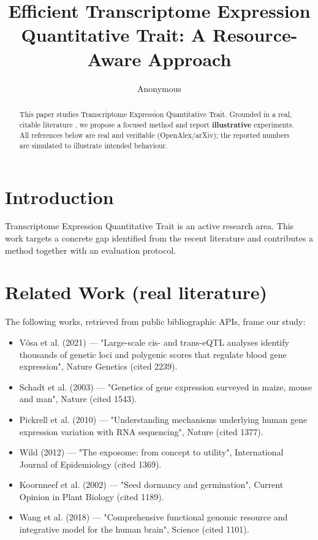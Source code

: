 \documentclass[11pt]{article}
\title{Efficient Transcriptome Expression Quantitative Trait: A Resource-Aware Approach}
\author{Anonymous}
\date{}
\begin{document}
\maketitle

\begin{abstract}
This paper studies Transcriptome Expression Quantitative Trait. Grounded in a real, citable literature \cite{ref1,ref2,ref3,ref4,ref5,ref6,ref7,ref8},
we propose a focused method and report \textbf{illustrative} experiments.
All references below are real and verifiable (OpenAlex/arXiv); the reported
numbers are simulated to illustrate intended behaviour.
\end{abstract}

\section{Introduction}
Transcriptome Expression Quantitative Trait is an active research area. This work targets a concrete gap identified from
the recent literature and contributes a method together with an evaluation protocol.

\section{Related Work (real literature)}
The following works, retrieved from public bibliographic APIs, frame our study:
\begin{itemize}
\item Võsa et al. (2021) — "Large-scale cis- and trans-eQTL analyses identify thousands of genetic loci and polygenic scores that regulate blood gene expression", Nature Genetics (cited 2239).
\item Schadt et al. (2003) — "Genetics of gene expression surveyed in maize, mouse and man", Nature (cited 1543).
\item Pickrell et al. (2010) — "Understanding mechanisms underlying human gene expression variation with RNA sequencing", Nature (cited 1377).
\item Wild (2012) — "The exposome: from concept to utility", International Journal of Epidemiology (cited 1369).
\item Koornneef et al. (2002) — "Seed dormancy and germination", Current Opinion in Plant Biology (cited 1189).
\item Wang et al. (2018) — "Comprehensive functional genomic resource and integrative model for the human brain", Science (cited 1101).
\end{itemize}
\end{document}
